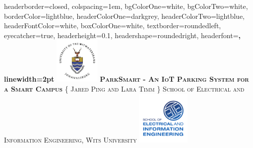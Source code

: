 \documentclass[landscape,a0paper,fontscale=0.285]{baposter} %
\begin{document}
\begin{poster}
{
headerborder=closed, %
colspacing=1em, %
bgColorOne=white, %
bgColorTwo=white, %
borderColor=lightblue, %
headerColorOne=darkgrey, %
headerColorTwo=lightblue, %
headerFontColor=white, %
boxColorOne=white, %
textborder=roundedleft, %
eyecatcher=true, %
headerheight=0.1\textheight, %
headershape=roundedright, %
headerfont=\Large\bf\textsc, %
linewidth=2pt %
}
%
{\includegraphics[height = 6em]{wits-logo-1.jpg}} %
{\bf\textsc{ParkSmart - An IoT Parking System for a Smart Campus }\vspace{0.5em}} %
{\textsc{\{ Jared Ping and Lara Timm \} \hspace{12pt} School of Electrical and Information Engineering, Wits University}} %
{\includegraphics[height=7em]{eie-logo.pdf}} %


\end{poster}
\end{document}
